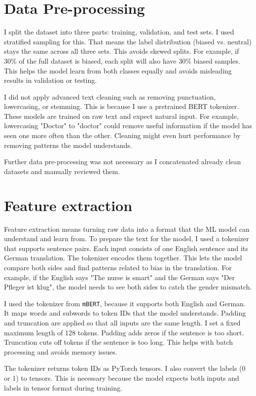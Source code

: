 \section{Data Pre-processing}

I split the dataset into three parts: training, validation, and test sets. I used stratified sampling for this. That means the label distribution (biased vs. neutral) stays the same across all three sets. This avoids skewed splits. For example, if 30\% of the full dataset is biased, each split will also have 30\% biased samples. This helps the model learn from both classes equally and avoids misleading results in validation or testing.

I did not apply advanced text cleaning such as removing punctuation, lowercasing, or stemming. This is because I use a pretrained BERT tokenizer. These models are trained on raw text and expect natural input. For example, lowercasing "Doctor" to "doctor" could remove useful information if the model has seen one more often than the other. Cleaning might even hurt performance by removing patterns the model understands.

Further data pre-processing was not necessary as I concatenated already clean datasets and manually reviewed them.

\section{Feature extraction}
Feature extraction means turning raw data into a format that the ML model can understand and learn from. To prepare the text for the model, I used a tokenizer that supports sentence pairs. Each input consists of one English sentence and its German translation. The tokenizer encodes them together. This lets the model compare both sides and find patterns related to bias in the translation. For example, if the English says "The nurse is smart" and the German says "Der Pfleger ist klug", the model needs to see both sides to catch the gender mismatch.

I used the tokenizer from \texttt{mBERT}, because it supports both English and German. It maps words and subwords to token IDs that the model understands. Padding and truncation are applied so that all inputs are the same length. I set a fixed maximum length of 128 tokens. Padding adds zeros if the sentence is too short. Truncation cuts off tokens if the sentence is too long. This helps with batch processing and avoids memory issues.

The tokenizer returns token IDs as PyTorch tensors. I also convert the labels (0 or 1) to tensors. This is necessary because the model expects both inputs and labels in tensor format during training.


